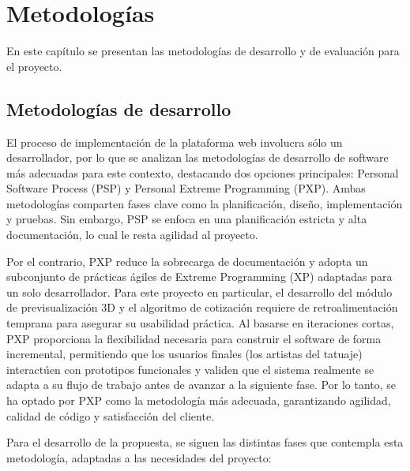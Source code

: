 \section{Metodologías }

En este capítulo se presentan las metodologías de desarrollo y de evaluación para el proyecto.

\subsection{Metodologías de desarrollo}

El proceso de implementación de la plataforma web involucra sólo un desarrollador, por lo que se analizan las metodologías de desarrollo de software más adecuadas para este contexto, destacando dos opciones principales: Personal Software Process (PSP)\cite{humphrey2000} y Personal Extreme Programming (PXP)\cite{dzhurov2009}. Ambas metodologías comparten fases clave como la planificación, diseño, implementación y pruebas. Sin embargo, PSP se enfoca en una planificación estricta y alta documentación, lo cual le resta agilidad al proyecto.

Por el contrario, PXP reduce la sobrecarga de documentación y adopta un subconjunto de prácticas ágiles de Extreme Programming (XP)\cite{joskowicz2008} adaptadas para un solo desarrollador. Para este proyecto en particular, el desarrollo del módulo de previsualización 3D y el algoritmo de cotización requiere de retroalimentación temprana para asegurar su usabilidad práctica. Al basarse en iteraciones cortas, PXP proporciona la flexibilidad necesaria para construir el software de forma incremental, permitiendo que los usuarios finales (los artistas del tatuaje) interactúen con prototipos funcionales y validen que el sistema realmente se adapta a su flujo de trabajo antes de avanzar a la siguiente fase. Por lo tanto, se ha optado por PXP como la metodología más adecuada, garantizando agilidad, calidad de código y satisfacción del cliente.

Para el desarrollo de la propuesta, se siguen las distintas fases que contempla esta metodología, adaptadas a las necesidades del proyecto:

